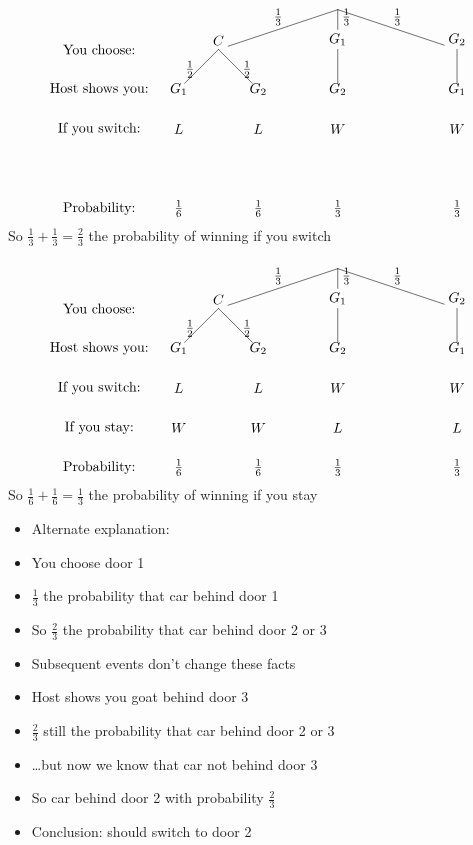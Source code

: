 \documentclass{beamer}
\theoremstyle{definition}
\begin{document}
\begin{frame}
\[\begin{xy}<1cm,0cm>:
(-6,-1)*{\text{You choose:}};
(-6,-2)*{\text{Host shows you:}};
(-6,-3)*{\text{If you switch:}};
(-6,-5)*{\text{Probability:}};
(0,0)="0";
(-3,-1)="-31";
(0,-1)="01";
(3,-1)="31";
"0";"-31"*+!D{C}**\dir{-}?*+!D{\frac{1}{3}};
"0";"01"*+!D{G_1}**\dir{-}?*+!DL{\frac{1}{3}};
"0";"31"*+!D{G_2}**\dir{-}?*+!D{\frac{1}{3}};
"-31";(-4,-2)*{G_1}**\dir{-}?*+!R{\frac{1}{2}};
"-31";(-2,-2)*{G_2}**\dir{-}?*+!L{\frac{1}{2}};
"01";(0,-2)*{G_2}**\dir{-};
"31";(3,-2)*{G_1}**\dir{-};
(-4,-3)*{L};(-2,-3)*{L};(0,-3)*{W};(3,-3)*{W};
(-4,-5)*{\frac{1}{6}};(-2,-5)*{\frac{1}{6}};
(0,-5)*{\frac{1}{3}};(3,-5)*{\frac{1}{3}};
\end{xy}\]
So $\frac{1}{3}+\frac{1}{3}=\frac{2}{3}$ the
probability of winning if you switch
\end{frame}

\begin{frame}
\[\begin{xy}<1cm,0cm>:
(-6,-1)*{\text{You choose:}};
(-6,-2)*{\text{Host shows you:}};
(-6,-3)*{\text{If you switch:}};
(-6,-4)*{\text{If you stay:}};
(-6,-5)*{\text{Probability:}};
(0,0)="0";
(-3,-1)="-31";
(0,-1)="01";
(3,-1)="31";
"0";"-31"*+!D{C}**\dir{-}?*+!D{\frac{1}{3}};
"0";"01"*+!D{G_1}**\dir{-}?*+!DL{\frac{1}{3}};
"0";"31"*+!D{G_2}**\dir{-}?*+!D{\frac{1}{3}};
"-31";(-4,-2)*{G_1}**\dir{-}?*+!R{\frac{1}{2}};
"-31";(-2,-2)*{G_2}**\dir{-}?*+!L{\frac{1}{2}};
"01";(0,-2)*{G_2}**\dir{-};
"31";(3,-2)*{G_1}**\dir{-};
(-4,-3)*{L};(-2,-3)*{L};(0,-3)*{W};(3,-3)*{W};
(-4,-4)*{W};(-2,-4)*{W};(0,-4)*{L};(3,-4)*{L};
(-4,-5)*{\frac{1}{6}};(-2,-5)*{\frac{1}{6}};
(0,-5)*{\frac{1}{3}};(3,-5)*{\frac{1}{3}};
\end{xy}\]
So $\frac{1}{6}+\frac{1}{6}=\frac{1}{3}$ the
probability of winning if you stay
\end{frame}

\begin{frame}
\begin{itemize}
\item Alternate explanation:
\item You choose door 1
\item $\frac{1}{3}$ the probability that car behind door 1
\item So $\frac{2}{3}$ the probability that car behind
door 2 or 3
\item Subsequent events don't change these facts
\item Host shows you goat behind door 3
\item $\frac{2}{3}$ still the probability that car behind
door 2 or 3
\item \dots but now we know that car \alert{not} behind
door 3
\item So car behind door 2 with probability $\frac{2}{3}$
\item Conclusion: should switch to door 2
\end{itemize}
\end{frame}
\end{document}
